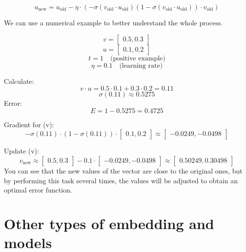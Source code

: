 \[
u_{\text{new}} = u_{\text{old}} - \eta \cdot \left(-\sigma(v_{\text{old}} \cdot u_{\text{old}})(1 - \sigma(v_{\text{old}} \cdot u_{\text{old}})) \cdot v_{\text{old}}\right)
\]

We can use a numerical example to better understand the whole process.

\[
v = \begin{bmatrix} 0.5, 0.3 \end{bmatrix}
\] \[
u = \begin{bmatrix} 0.1, 0.2 \end{bmatrix}
\] \[
t = 1 \quad \text{(positive example)}
\] \[
\eta = 0.1 \quad \text{(learning rate)}
\]

Calculate: \[
v \cdot u = 0.5 \cdot 0.1 + 0.3 \cdot 0.2 = 0.11
\] \[
\sigma(0.11) \approx 0.5275
\] Error: \[
E = 1 - 0.5275 = 0.4725
\]

Gradient for (v): \[
-\sigma(0.11) \cdot (1 - \sigma(0.11)) \cdot \begin{bmatrix} 0.1, 0.2 \end{bmatrix} \approx \begin{bmatrix} -0.0249, -0.0498 \end{bmatrix}
\]

Update (v): \[
v_{\text{new}} \approx \begin{bmatrix} 0.5, 0.3 \end{bmatrix} - 0.1 \cdot \begin{bmatrix} -0.0249, -0.0498 \end{bmatrix} \approx \begin{bmatrix} 0.50249, 0.30498 \end{bmatrix}
\] You can see that the new values of the vector are close to the
original ones, but by performing this task several times, the values
will be adjusted to obtain an optimal error function.

\section{Other types of embedding and models}\label{other-embeddings-and-models}

